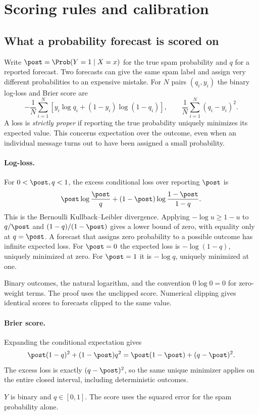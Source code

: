\section{Scoring rules and calibration}
\label{sec:calibration}

\subsection{What a probability forecast is scored on}
Write $\post=\Prob(Y=1\mid X=x)$ for the true spam probability and $q$ for a reported
forecast. Two forecasts can give the same spam label and assign very different probabilities
to an expensive mistake. For $N$ pairs $(q_i,y_i)$ the binary log-loss and Brier score are
\[
 -\frac{1}{N}\sum_{i=1}^N[y_i\log q_i+(1-y_i)\log(1-q_i)],
 \qquad \frac{1}{N}\sum_{i=1}^N(q_i-y_i)^2 .
\]
A loss is \emph{strictly proper} if reporting the true probability uniquely minimizes its
expected value. This concerns expectation over the outcome, even when an individual message
turns out to have been assigned a small probability.

\paragraph{Log-loss.}
For $0<\post,q<1$, the excess conditional loss over reporting $\post$ is
\[
 \post\log\frac{\post}{q}+(1-\post)\log\frac{1-\post}{1-q}.
\]
This is the Bernoulli Kullback--Leibler divergence. Applying $-\log u\geq 1-u$ to
$q/\post$ and $(1-q)/(1-\post)$ gives a lower bound of zero, with equality only at $q=\post$.
A forecast that assigns zero probability to a possible outcome has infinite expected loss.
For $\post=0$ the expected loss is $-\log(1-q)$, uniquely minimized at zero. For $\post=1$
it is $-\log q$, uniquely minimized at one.
\begin{assumptions}Binary outcomes, the natural logarithm, and the convention
$0\log 0=0$ for zero-weight terms. The proof uses the unclipped score. Numerical clipping
gives identical scores to forecasts clipped to the same value.\end{assumptions}

\paragraph{Brier score.}
Expanding the conditional expectation gives
\[
 \post(1-q)^2+(1-\post)q^2=\post(1-\post)+(q-\post)^2 .
\]
The excess loss is exactly $(q-\post)^2$, so the same unique minimizer applies on the
entire closed interval, including deterministic outcomes.
\begin{assumptions}$Y$ is binary and $q\in[0,1]$. The score uses the squared error for the
spam probability alone.\end{assumptions}


